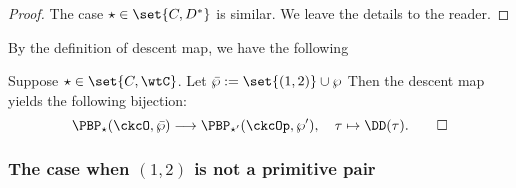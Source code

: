 \documentclass[ssunip]{subfiles}
\begin{document}
\begin{proof}
 The case $\star \in \set{C,D^*}$ is similar. We leave the details to the reader. 
\end{proof}

By the definition of descent map, we have the following
\begin{cor}
Suppose $\star \in \set{C,\wtC}$.
Let $\bar\wp := \set{(1,2)} \cup \wp$
Then the descent map yields the following bijection:
\begin{equation}\label{eq:DD.bij.ns}
\PBP_\star(\ckcO,\bar\wp)\longrightarrow  \PBP_{\star'}(\ckcOp,\wp') ,\quad 
\tau \mapsto \DD(\tau).  \qed
\end{equation}
\end{cor}

\subsubsection{The case when $(1,2)$ is not a primitive pair}
\end{document}

